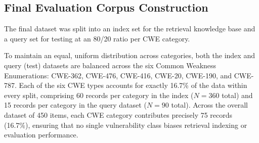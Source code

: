 \subsection{Final Evaluation Corpus Construction}

The final dataset was split into an index set for the retrieval knowledge base and a query set for testing at an 80/20 ratio per CWE category. 

To maintain an equal, uniform distribution across categories, both the index and query (test) datasets are balanced across the six Common Weakness Enumerations: CWE-362, CWE-476, CWE-416, CWE-20, CWE-190, and CWE-787. 
Each of the six CWE types accounts for exactly 16.7\% of the data within every split, comprising 60 records per category in the index ($N = 360$ total) and 15 records per category in the query dataset ($N = 90$ total). Across the overall dataset of 450 items, each CWE category contributes precisely 75 records (16.7\%), ensuring that no single vulnerability class biases retrieval indexing or evaluation performance.

